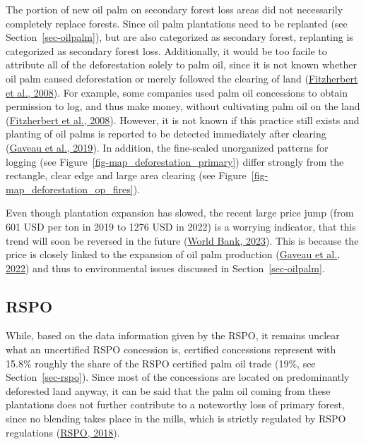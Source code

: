 \documentclass[
  letterpaper,
  DIV=11,
  numbers=noendperiod]{scrreprt}
\begin{document}
The portion of new oil palm on secondary forest loss areas did not
necessarily completely replace forests. Since oil palm plantations need
to be replanted (see Section~\ref{sec-oilpalm}), but are also
categorized as secondary forest, replanting is categorized as secondary
forest loss. Additionally, it would be too facile to attribute all of
the deforestation solely to palm oil, since it is not known whether oil
palm caused deforestation or merely followed the clearing of land
(\protect\hyperlink{ref-fitzherbertHowWillOil2008}{Fitzherbert et al.,
2008}). For example, some companies used palm oil concessions to obtain
permission to log, and thus make money, without cultivating palm oil on
the land (\protect\hyperlink{ref-fitzherbertHowWillOil2008}{Fitzherbert
et al., 2008}). However, it is not known if this practice still exists
and planting of oil palms is reported to be detected immediately after
clearing (\protect\hyperlink{ref-gaveauRiseFallForest2019}{Gaveau et
al., 2019}). In addition, the fine-scaled unorganized patterns for
logging (see Figure~\ref{fig-map_deforestation_primary}) differ strongly
from the rectangle, clear edge and large area clearing (see
Figure~\ref{fig-map_deforestation_op_fires}).

Even though plantation expansion has slowed, the recent large price jump
(from 601 USD per ton in 2019 to 1276 USD in 2022) is a worrying
indicator, that this trend will soon be reversed in the future
(\protect\hyperlink{ref-worldbankAveragePricesPalm2023}{World Bank,
2023}). This is because the price is closely linked to the expansion of
oil palm production
(\protect\hyperlink{ref-gaveauSlowingDeforestationIndonesia2022}{Gaveau
et al., 2022}) and thus to environmental issues discussed in
Section~\ref{sec-oilpalm}.

\hypertarget{rspo}{%
\subsection{RSPO}\label{rspo}}

While, based on the data information given by the RSPO, it remains
unclear what an uncertified RSPO concession is, certified concessions
represent with 15.8\% roughly the share of the RSPO certified palm oil
trade (19\%, see Section~\ref{sec-rspo}). Since most of the concessions
are located on predominantly deforested land anyway, it can be said that
the palm oil coming from these plantations does not further contribute
to a noteworthy loss of primary forest, since no blending takes place in
the mills, which is strictly regulated by RSPO regulations
(\protect\hyperlink{ref-rspoRSPOPrinciplesCriteria2018}{RSPO, 2018}).
\end{document}

